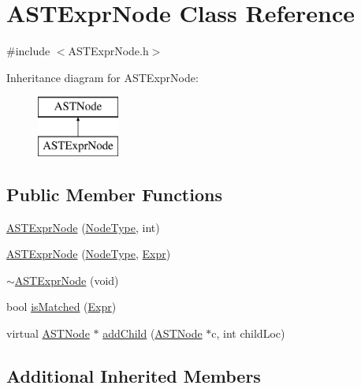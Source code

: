 \hypertarget{class_a_s_t_expr_node}{\section{A\-S\-T\-Expr\-Node Class Reference}
\label{class_a_s_t_expr_node}
}


{\ttfamily \#include $<$A\-S\-T\-Expr\-Node.\-h$>$}

Inheritance diagram for A\-S\-T\-Expr\-Node\-:\begin{figure}[H]
\begin{center}
\leavevmode
\includegraphics[height=2.000000cm]{class_a_s_t_expr_node}
\end{center}
\end{figure}
\subsection*{Public Member Functions}
\begin{DoxyCompactItemize}
\item 
\hyperlink{class_a_s_t_expr_node_ab239cadd56dc305eba5352a91a8a5499}{A\-S\-T\-Expr\-Node} (\hyperlink{class_a_s_t_node_a4fd016b5f0e44ea6aca3542d27de3859}{Node\-Type}, int)
\item 
\hyperlink{class_a_s_t_expr_node_a8f009ba4853cc2bbcfc05cd4ad026435}{A\-S\-T\-Expr\-Node} (\hyperlink{class_a_s_t_node_a4fd016b5f0e44ea6aca3542d27de3859}{Node\-Type}, \hyperlink{_a_s_t_expr_node_8h_a4f1a4923fbba2992d48ff9e103b110f5}{Expr})
\item 
\hyperlink{class_a_s_t_expr_node_a6ac628dd48fdff2a9fa0a4bcf8519897}{$\sim$\-A\-S\-T\-Expr\-Node} (void)
\item 
bool \hyperlink{class_a_s_t_expr_node_aaf52939daade8e944719282e5d2ab56c}{is\-Matched} (\hyperlink{_a_s_t_expr_node_8h_a4f1a4923fbba2992d48ff9e103b110f5}{Expr})
\item 
virtual \hyperlink{class_a_s_t_node}{A\-S\-T\-Node} $\ast$ \hyperlink{class_a_s_t_expr_node_a3cc0853d56a228c482fe322737e40d84}{add\-Child} (\hyperlink{class_a_s_t_node}{A\-S\-T\-Node} $\ast$c, int child\-Loc)
\end{DoxyCompactItemize}
\subsection*{Additional Inherited Members}


